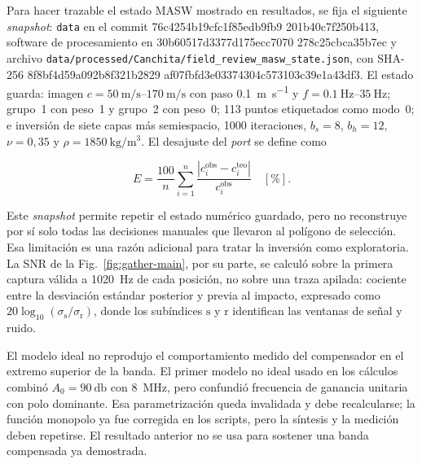 \begin{sloppypar}
Para hacer trazable el estado MASW mostrado en resultados, se fija el siguiente
\emph{snapshot}: \texttt{data} en el commit
{\ttfamily\footnotesize 76c4254b19cf\allowbreak c1f85edb9fb9\allowbreak
201b40c7f250\allowbreak b413},
software de procesamiento en
{\ttfamily\footnotesize 30b60517d337\allowbreak 7d175ecc7070\allowbreak
278c25cbca35\allowbreak b7ec}
y archivo
\nolinkurl{data/processed/Canchita/field_review_masw_state.json}, con SHA-256
{\ttfamily\footnotesize 8f8bf4d59a09\allowbreak 2b8f321b2829\allowbreak
af07fbfd3e03\allowbreak 374304c57310\allowbreak 3c39e1a43df3}.
El estado guarda: imagen $c=\SIrange{50}{170}{\meter\per\second}$ con paso
\SI{0.1}{\meter\per\second} y $f=\SIrange{0.1}{35}{\hertz}$; grupo~1 con peso~1 y
grupo~2 con peso~0; 113 puntos etiquetados como modo~0; e inversi\'on de siete capas
m\'as semiespacio, 1000 iteraciones, $b_s=8$, $b_h=12$, $\nu=0{,}35$ y
$\rho=\SI{1850}{\kilogram\per\meter\cubed}$. El desajuste del \emph{port} se define como
\end{sloppypar}

\begin{equation}
E=\frac{100}{n}\sum_{i=1}^{n}\frac{|c_i^{\mathrm{obs}}-c_i^{\mathrm{teo}}|}
{c_i^{\mathrm{obs}}}\quad[\%].
\end{equation}

Este \emph{snapshot} permite repetir el estado num\'erico guardado, pero no reconstruye
por s\'i solo todas las decisiones manuales que llevaron al pol\'igono de selecci\'on. Esa
limitaci\'on es una raz\'on adicional para tratar la inversi\'on como exploratoria. La SNR
de la Fig.~\ref{fig:gather-main}, por su parte, se calcul\'o sobre la primera captura
v\'alida a \SI{1020}{\hertz} de cada posici\'on, no sobre una traza apilada: cociente entre
la desviaci\'on est\'andar posterior y previa al impacto, expresado como
$20\log_{10}(\sigma_{\mathrm{s}}/\sigma_{\mathrm{r}})$, donde los sub\'indices
$\mathrm{s}$ y $\mathrm{r}$ identifican las ventanas de se\~nal y ruido.

El modelo ideal no reprodujo el comportamiento medido del compensador en el extremo
superior de la banda. El primer modelo no ideal usado en los c\'alculos combin\'o
$A_0=\SI{90}{\decibel}$ con \SI{8}{\mega\hertz}, pero confundi\'o frecuencia de ganancia
unitaria con polo dominante. Esa parametrizaci\'on queda invalidada y debe recalcularse;
la funci\'on monopolo ya fue corregida en los scripts, pero la s\'intesis y la medici\'on
deben repetirse. El resultado anterior no se usa para sostener una banda compensada ya
demostrada.

